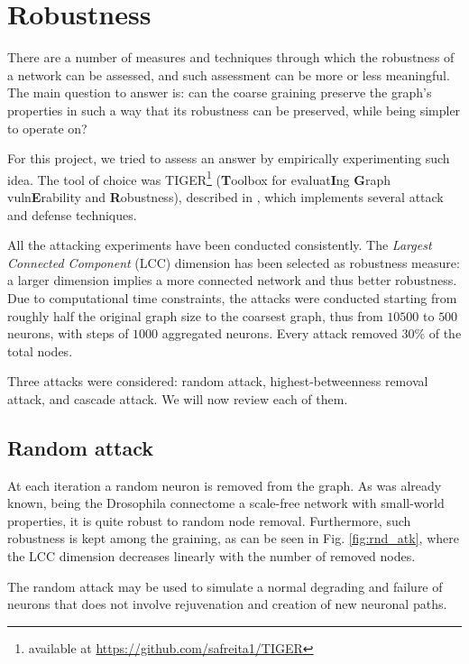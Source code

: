 \section{Robustness \label{sec:rob}}
There are a number of measures and techniques through which the robustness of a network can be assessed, and such assessment can be more or less meaningful. The main question to answer is: can the coarse graining preserve the graph's properties in such a way that its robustness can be preserved, while being simpler to operate on?

For this project, we tried to assess an answer by empirically experimenting such idea. The tool of choice was TIGER\footnote{available at \href{https://github.com/safreita1/TIGER}{https://github.com/safreita1/TIGER}} (\textbf{T}oolbox for evaluat\textbf{I}ng \textbf{G}raph vuln\textbf{E}rability and \textbf{R}obustness), described in \cite{freitas2020tiger}, which implements several attack and defense techniques. 

All the attacking experiments have been conducted consistently. The \textit{Largest Connected Component} (LCC) dimension has been selected as robustness measure: a larger dimension implies a more connected network and thus better robustness. Due to computational time constraints, the attacks were conducted starting from roughly half the original graph size to the coarsest graph, thus from $10500$ to $500$ neurons, with steps of $1000$ aggregated neurons. Every attack removed 30\% of the total nodes.

Three attacks were considered: random attack, highest-betweenness removal attack, and cascade attack. We will now review each of them.

\subsection{Random attack}
At each iteration a random neuron is removed from the graph. As was already known, being the Drosophila connectome a scale-free network with small-world properties, it is quite robust to random node removal. Furthermore, such robustness is kept among the graining, as can be seen in Fig. \ref{fig:rnd_atk}, where the LCC dimension decreases linearly with the number of removed nodes. 

The random attack may be used to simulate a normal degrading and failure of neurons that does not  involve rejuvenation and creation of new neuronal paths. 

